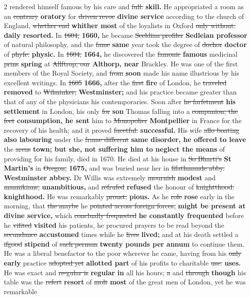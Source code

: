 \documentclass[10pt]{article}
\begin{document}
\begin{multicols}{2}
rendered himself famous by his care and \sout{full.} \textbf{skill.} He appropriated a room as an \sout{contrary} \textbf{oratory} for \sout{driven revoc} \textbf{divine service} according to the church of England, \sout{whether end} \textbf{whither most} of the loyalists in Oxford \sout{only without.} \textbf{daily resorted.} In \sout{1604,} \textbf{1660,} he became \sout{Seeldian profiler} \textbf{Sedleian professor} of natural philosophy, and the \sout{fame} \textbf{same} year took the degree of \sout{dochor} \textbf{doctor} of \sout{phyfe.} \textbf{physic.} In \sout{1604,} \textbf{1664,} he discovered the \sout{famonic} \textbf{famous} medicinal \sout{prins} \textbf{spring} at \sout{Allftrop, our} \textbf{Althorp, near} Brackley. He was one of the first members of the Royal Society, and \sout{from} \textbf{soon} made his name illustrious by his excellent writings. In \sout{1605} \textbf{1666,} after the \sout{first} \textbf{fire} of London, he \sout{traveled} \textbf{removed} to \sout{Wilminker;} \textbf{Westminster;} and his practice became greater than that of any of the physicians his contemporaries. Soon after \sout{he farfetment} \textbf{his settlement} in London, his only \sout{for} \textbf{son} Thomas falling into a \sout{companion, the feet} \textbf{consumption, he sent} him to \sout{Monopolier} \textbf{Montpellier} in France for the recovery of his health; and it proved \sout{fucetful.} \textbf{successful.} His wife \sout{allo boating} \textbf{also labouring} under the \sout{frame different} \textbf{same disorder, he offered to leave} the \sout{areas} \textbf{town; but she, not suffering him to neglect the means} of providing for his family, died in 1670. He died at his house in \sout{So Bharti's} \textbf{St Martin's} in \sout{Oregon,} \textbf{1675,} and was buried near her in \sout{fifathmande abby.} \textbf{Westminster abbey.} Dr Willis was extremely \sout{mournish} \textbf{modest} and \sout{mannikians,} \textbf{unambitious,} and \sout{refrufed} \textbf{refused} the honour of \sout{knightthood.} \textbf{knighthood.} He was remarkably \sout{proust.} \textbf{pious.} As he \sout{role} \textbf{rose} early in the morning, that \sout{the maybe} he \sout{pointed across foreign forces,} \textbf{might be present at divine service,} which \sout{conclually frequested} \textbf{he constantly frequented} before he \sout{vifited} \textbf{visited} his patients, he procured prayers to be read beyond the \sout{secundance} \textbf{accustomed} times while he \sout{lives} \textbf{lived;} and at his death settled a \sout{ifgood} \textbf{stipend} of \sout{such pernum} \textbf{twenty pounds per annum} to continue them. He was a liberal benefactor to the poor wherever he came, having from his \sout{only} \textbf{early} practice \sout{adopted yet} \textbf{allotted part} of his profits to charitable \sout{use.} \textbf{uses.} He was exact and \sout{re-gular is} \textbf{regular in} all his hours; \sout{a} and \sout{through} \textbf{though} his table was the \sout{refert} \textbf{resort} of \sout{molt} \textbf{most} of the great men of London, yet he was remarkable
\end{multicols}
\end{document}
